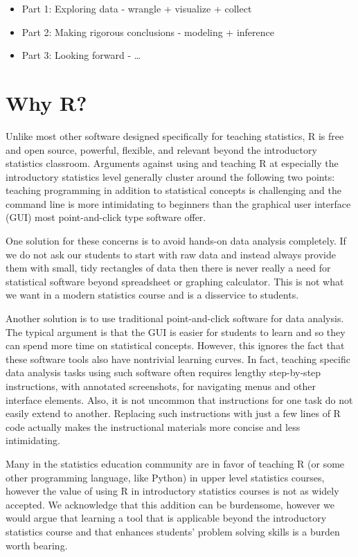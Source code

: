 \documentclass[]{book}
\providecommand{\tightlist}{%
  \setlength{\itemsep}{0pt}\setlength{\parskip}{0pt}}
\theoremstyle{definition}
\theoremstyle{definition}
\theoremstyle{definition}
\theoremstyle{remark}
\begin{document}
\begin{itemize}
\tightlist
\item
  Part 1: Exploring data - wrangle + visualize + collect
\item
  Part 2: Making rigorous conclusions - modeling + inference
\item
  Part 3: Looking forward - \ldots{}
\end{itemize}

\section{Why R?}\label{why-r}

Unlike most other software designed specifically for teaching
statistics, R is free and open source, powerful, flexible, and relevant
beyond the introductory statistics classroom. Arguments against using
and teaching R at especially the introductory statistics level generally
cluster around the following two points: teaching programming in
addition to statistical concepts is challenging and the command line is
more intimidating to beginners than the graphical user interface (GUI)
most point-and-click type software offer.

One solution for these concerns is to avoid hands-on data analysis
completely. If we do not ask our students to start with raw data and
instead always provide them with small, tidy rectangles of data then
there is never really a need for statistical software beyond spreadsheet
or graphing calculator. This is not what we want in a modern statistics
course and is a disservice to students.

Another solution is to use traditional point-and-click software for data
analysis. The typical argument is that the GUI is easier for students to
learn and so they can spend more time on statistical concepts. However,
this ignores the fact that these software tools also have nontrivial
learning curves. In fact, teaching specific data analysis tasks using
such software often requires lengthy step-by-step instructions, with
annotated screenshots, for navigating menus and other interface
elements. Also, it is not uncommon that instructions for one task do not
easily extend to another. Replacing such instructions with just a few
lines of R code actually makes the instructional materials more concise
and less intimidating.

Many in the statistics education community are in favor of teaching R
(or some other programming language, like Python) in upper level
statistics courses, however the value of using R in introductory
statistics courses is not as widely accepted. We acknowledge that this
addition can be burdensome, however we would argue that learning a tool
that is applicable beyond the introductory statistics course and that
enhances students' problem solving skills is a burden worth bearing.
\end{document}
